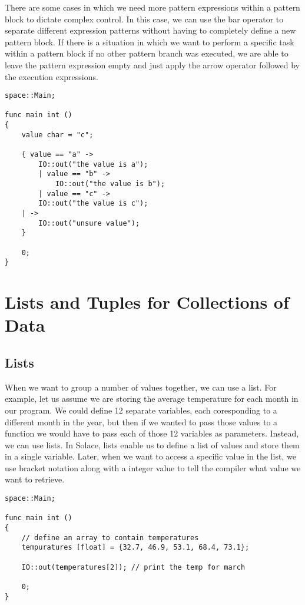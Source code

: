 \documentclass{article}
\begin{document}
There are some cases in which we need more pattern expressions within a pattern block to dictate complex control. In this case, we can use the bar operator to separate different
expression patterns without having to completely define a new pattern block. If there is a situation in which we want to perform a specific task within a pattern block if no other
pattern branch was executed, we are able to leave the pattern expression empty and just apply the arrow operator followed by the execution expressions.

\begin{lstlisting}
space::Main;

func main int ()
{
	value char = "c";

 	{ value == "a" ->
  		IO::out("the value is a");
    	| value == "b" ->
     		IO::out("the value is b");
        | value == "c" ->
		IO::out("the value is c");
  	| ->
   		IO::out("unsure value");
  	}

	0;
}
\end{lstlisting}


\section{Lists and Tuples for Collections of Data}

\subsection{Lists}

When we want to group a number of values together, we can use a list. For example, let us assume we are storing the average temperature for each month in our program.
We could define 12 separate variables, each coresponding to a different month in the year, but then if we wanted to pass those values to a function we would have to pass
each of those 12 variables as parameters. Instead, we can use lists. In Solace, lists enable us to define a list of values and store them in a single variable.
Later, when we want to access a specific value in the list, we use bracket notation along with a integer value to tell the compiler what value we want to retrieve.

\begin{lstlisting}
space::Main;

func main int ()
{
	// define an array to contain temperatures
	tempuratures [float] = {32.7, 46.9, 53.1, 68.4, 73.1};

	IO::out(temperatures[2]); // print the temp for march

	0;
}
\end{lstlisting}
\end{document}
